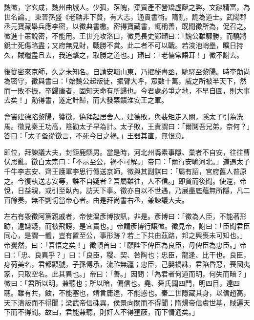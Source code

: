
\begin{pinyinscope}

 魏徵，字玄成，魏州曲城人。少孤，落魄，棄貲產不營矯虛誕之弊。文辭精富，為世名論。」東晉孫盛《老聃非下賢，有大志，通貫書術。隋亂，詭為道士。武陽郡丞元寶藏舉兵應李密，以徵典書檄。密得寶藏書，輒稱善，既聞徵所為，促召之。徵進十策說密，不能用。王世充攻洛口，徵見長史鄭頲曰：「魏公雖驟勝，而驍將銳士死傷略盡；又府無見財，戰勝不賞。此二者不可以戰。若浚池峭壘，曠日持久，賊糧盡且去，我追擊之，取勝之道也。」頲曰：「老儒常語耳！」徵不謝去。



 後從密來京師，久之未知名。自請安輯山東，乃擢秘書丞，馳驛至黎陽。時李勣尚為密守，徵與書曰：「始魏公起叛徒，振臂大呼，眾數十萬，威之所被半天下，然而一敗不振，卒歸唐者，固知天命有所歸也。今君處必爭之地，不早自圖，則大事去矣！」勣得書，遂定計歸，而大發粟饋淮安王之軍。



 會竇建德陷黎陽，獲徵，偽拜起居舍人。建德敗，與裴矩走入關，隱太子引為洗馬。徵見秦王功高，陰勸太子早為計。太子敗，王責謂曰：「爾鬩吾兄弟，奈何？」答曰：「太子蚤從徵言，不死今日之禍。」王器其直，無恨意。



 即位，拜諫議大夫，封鉅鹿縣男。當是時，河北州縣素事隱、巢者不自安，往往曹伏思亂。徵白太宗曰：「不示至公，禍不可解。」帝曰：「爾行安喻河北。」道遇太子千牛李志安、齊王護軍李思行傳送京師，徵與其副謀曰：「屬有詔，宮府舊人普原之。今復執送志安等，誰不自疑者？吾屬雖往，人不信。」即貸而後聞。使還，帝悅，日益親，或引至臥內，訪天下事。徵亦自以不世遇，乃展盡底蘊無所隱，凡二百餘奏，無不剴切當帝心者。由是拜尚書右丞，兼諫議大夫。



 左右有毀徵阿黨親戚者，帝使溫彥博按訊，非是。彥博曰：「徵為人臣，不能著形跡，遠嫌疑，而被飛謗，是宜責也。」帝謂彥博行讓徵。徵見帝，謝曰：「臣聞君臣同心，是謂一體，豈有置至公，事形跡？若上下共由茲路，邦之興喪未可知也。」帝矍然，曰：「吾悟之矣！」徵頓首曰：「願陛下俾臣為良臣，毋俾臣為忠臣。」帝曰：「忠、良異乎？」曰：「良臣，稷、契、咎陶也；忠臣，龍逢、比干也。良臣，身荷美名，君都顯號，子孫傅承，流祚無疆；忠臣，己嬰禍誅，君陷昏惡，喪國夷家，只取空名。此其異也。」帝曰：「善。」因問：「為君者何道而明，何失而暗？」徵曰：「君所以明，兼聽也；所以暗，偏信也。堯、舜氏闢四門，明四目，達四聰。雖有共，鮌，不能塞也，靖言庸違，不能惑也。秦二世隱藏其身，以信趙高，天下潰叛而不得聞；梁武帝信硃異，侯景向關而不得聞；隋煬帝信虞世基，賊遍天下而不得聞。故曰，君能兼聽，則奸人不得壅蔽，而下情通矣。」




\end{pinyinscope}
